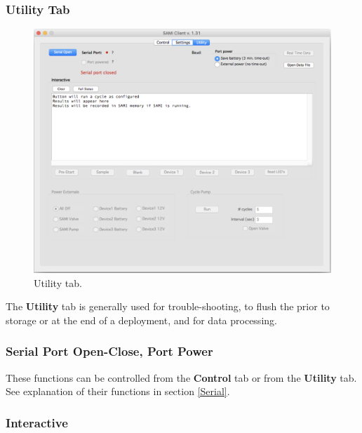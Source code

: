 \fi


\subsubsection{Utility Tab}

\begin{figure}[ht]
\centering
\includegraphics[width=1.0\textwidth]{figs/Util_Tab.png}
\caption{Utility tab.}
\label{fig:UtilTab}
\end{figure}

The \textbf{Utility} tab is generally used for trouble-shooting, to flush the \instType{} prior to storage or at the end of a deployment, and for data processing.


\subsubsection{Serial Port Open-Close, Port Power}

These functions can be controlled from the \textbf{Control} tab or from the \textbf{Utility} tab. See explanation of their functions in section \ref{Serial}.


\subsubsection{Interactive}

\ifcase \inst	%

